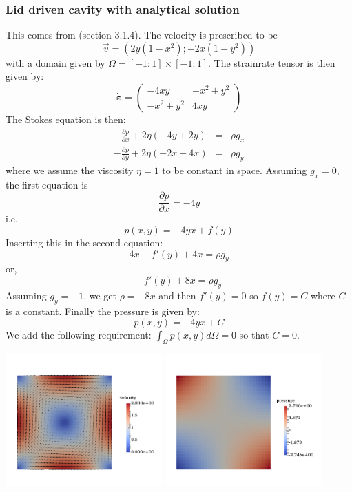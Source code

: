 \subsubsection{Lid driven cavity with analytical solution} \label{sec:ldc_anal}

This comes from \cite{elsw}(section 3.1.4). The velocity is prescribed to be
\[
{\vec v}=(2y(1-x^2) ; -2x(1-y^2) )
\]
with a domain given by $\Omega=[-1:1]\times[-1:1]$.
The strainrate tensor is then given by:
\[
\dot{\bm \varepsilon}=
\left(
\begin{array}{cc}
-4xy & -x^2+y^2  \\
-x^2+y^2 & 4xy   
\end{array}
\right)
\]
The Stokes equation is then:
\begin{eqnarray}
-\frac{\partial p}{\partial x} + 2\eta ( -4y + 2y ) &=& \rho g_x \\
-\frac{\partial p}{\partial y} + 2\eta ( -2x + 4x ) &=& \rho g_y
\end{eqnarray}
where we assume the viscosity $\eta=1$ to be constant in space.
Assuming $g_x=0$, the first equation is
\[
\frac{\partial p}{\partial x} = - 4 y
\]
i.e.
\[
p(x,y)= -4  y x +f(y)
\]
Inserting this in the second equation:
\[
4  x - f'(y) + 4 x  = \rho g_y
\]
or,
\[
-f'(y) + 8  x  = \rho g_y
\]
Assuming $g_y=-1$, we get $\rho=-8x$ and then $f'(y)=0$ so $f(y)=C$ where $C$
is a constant.
Finally the pressure is given by:
\[
p(x,y)=-4  y x + C
\]
We add the following requirement: $\int_\Omega p(x,y) d\Omega =0$ so that $C=0$.

\begin{center}
\includegraphics[width=6cm]{images/benchmark_ldc_anal/velo}
\includegraphics[width=6cm]{images/benchmark_ldc_anal/press}
\end{center}

